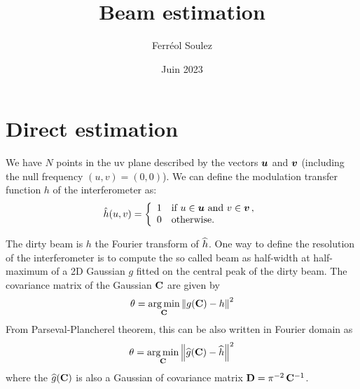 \documentclass[a4paper,11pt,twoside]{scrartcl}
\title{Beam estimation}
\author{Ferréol Soulez }
\date{Juin 2023}
\begin{document}
\maketitle

\section{Direct estimation}

We have $N$ points in the uv plane described by the vectors $\boldsymbol{u}$ and $\boldsymbol{v}$ (including the null frequency  $(u,v) = (0,0)$). We can define the modulation transfer function $h$ of the interferometer  as:
\begin{equation}
	\hat{h}(u, v) = \left\{
		\begin{array}{ll}
		1 &\text{if } u \in \boldsymbol{u} \text{ and } v \in \boldsymbol{v}\,,\\
		0 &\text{otherwise.}
	\end{array} \right.
\end{equation} 

The dirty beam is $h$  the Fourier transform of $\widehat{h}$. One way to define the resolution of the interferometer is to compute the so called beam as half-width at half-maximum of a 2D Gaussian $g$ fitted on the central peak of the dirty beam. The covariance matrix of the Gaussian $\mathbf{C}$ are given by
\begin{equation}
	\theta =  \argmin_{\M C} \Norm{ g(\M C) - h}^2 
\end{equation}
From  Parseval-Plancherel theorem, this can be also written in Fourier domain as
\begin{equation}
	\theta =  \argmin_{\M C} \Norm{\FT{g}(\M C) - \FT{h}}^2 
\end{equation}
where the $\widehat{g}(\mathbf{C})$ is also a Gaussian of covariance matrix $\mathbf{D} = \pi^{-2}\,\mathbf{C}^{-1}$.
\end{document}
